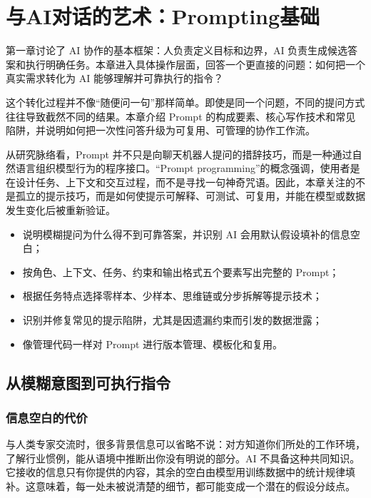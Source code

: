 ﻿\chapter{与AI对话的艺术：Prompting基础}

第一章讨论了 AI 协作的基本框架：人负责定义目标和边界，AI 负责生成候选答案和执行明确任务。本章进入具体操作层面，回答一个更直接的问题：如何把一个真实需求转化为 AI 能够理解并可靠执行的指令？

这个转化过程并不像“随便问一句”那样简单。即使是同一个问题，不同的提问方式往往导致截然不同的结果。本章介绍 Prompt 的构成要素、核心写作技术和常见陷阱，并说明如何把一次性问答升级为可复用、可管理的协作工作流。

从研究脉络看，Prompt 并不只是向聊天机器人提问的措辞技巧，而是一种通过自然语言组织模型行为的程序接口。“Prompt programming”的概念强调，使用者是在设计任务、上下文和交互过程，而不是寻找一句神奇咒语\cite{reynolds2021prompt}。因此，本章关注的不是孤立的提示技巧，而是如何使提示可解释、可测试、可复用，并能在模型或数据发生变化后被重新验证。

\begin{chapterguide}
\begin{itemize}
  \item 说明模糊提问为什么得不到可靠答案，并识别 AI 会用默认假设填补的信息空白；
  \item 按角色、上下文、任务、约束和输出格式五个要素写出完整的 Prompt；
  \item 根据任务特点选择零样本、少样本、思维链或分步拆解等提示技术；
  \item 识别并修复常见的提示陷阱，尤其是因遗漏约束而引发的数据泄露；
  \item 像管理代码一样对 Prompt 进行版本管理、模板化和复用。
\end{itemize}
\end{chapterguide}

\section{从模糊意图到可执行指令}

\subsection{信息空白的代价}

与人类专家交流时，很多背景信息可以省略不说：对方知道你们所处的工作环境，了解行业惯例，能从语境中推断出你没有明说的部分。AI 不具备这种共同知识。它接收的信息只有你提供的内容，其余的空白由模型用训练数据中的统计规律填补。这意味着，每一处未被说清楚的细节，都可能变成一个潜在的假设分歧点。

